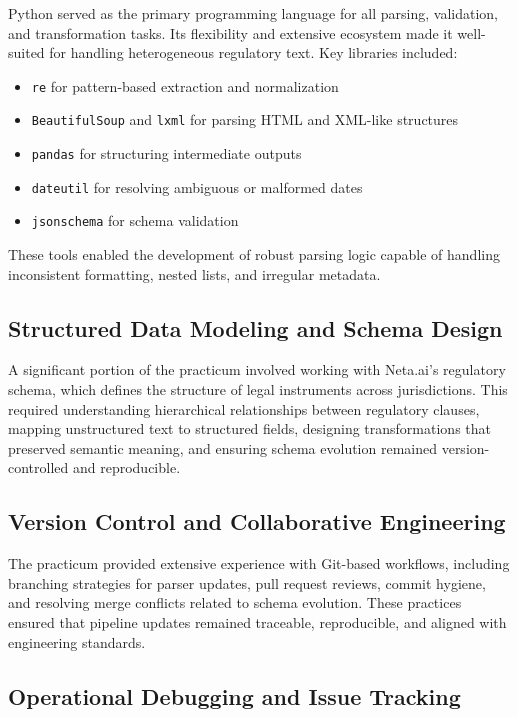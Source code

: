 \documentclass[sigconf]{acmart}
\begin{document}
Python served as the primary programming language for all parsing, validation, and transformation tasks. Its flexibility and extensive ecosystem made it well-suited for handling heterogeneous regulatory text. Key libraries included:

\begin{itemize}
    \item \texttt{re} for pattern-based extraction and normalization
    \item \texttt{BeautifulSoup} and \texttt{lxml} for parsing HTML and XML-like structures
    \item \texttt{pandas} for structuring intermediate outputs
    \item \texttt{dateutil} for resolving ambiguous or malformed dates
    \item \texttt{jsonschema} for schema validation
\end{itemize}

These tools enabled the development of robust parsing logic capable of handling inconsistent formatting, nested lists, and irregular metadata.

\subsection{Structured Data Modeling and Schema Design}

A significant portion of the practicum involved working with Neta.ai’s regulatory schema, which defines the structure of legal instruments across jurisdictions. This required understanding hierarchical relationships between regulatory clauses, mapping unstructured text to structured fields, designing transformations that preserved semantic meaning, and ensuring schema evolution remained version-controlled and reproducible.

\subsection{Version Control and Collaborative Engineering}

The practicum provided extensive experience with Git-based workflows, including branching strategies for parser updates, pull request reviews, commit hygiene, and resolving merge conflicts related to schema evolution. These practices ensured that pipeline updates remained traceable, reproducible, and aligned with engineering standards.

\subsection{Operational Debugging and Issue Tracking}
\end{document}
